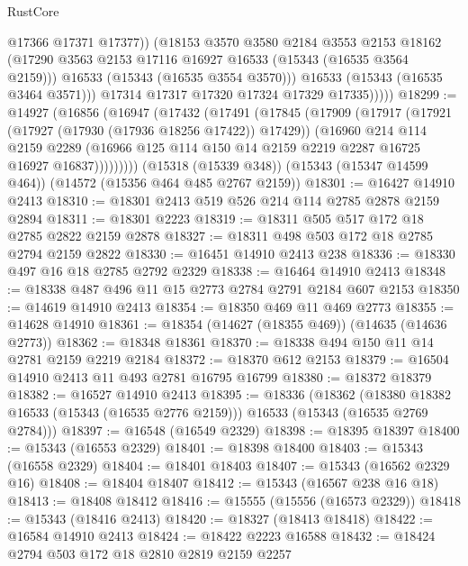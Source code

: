 \begin{lexlean}{RustCore}
\begin{coremodule}
                    @17366
                    @17371
                    @17377))
                (@18153
                  @3570
                  @3580
                  @2184
                  @3553
                  @2153
                  @18162
                  (@17290 @3563 @2153 @17116 @16927 @16533 (@15343 (@16535 @3564 @2159)))
                  @16533
                  (@15343 (@16535 @3554 @3570)))
                @16533
                (@15343 (@16535 @3464 @3571)))
              @17314
              @17317
              @17320
              @17324
              @17329
              @17335)))))
@18299 := @14927
    (@16856
      (@16947
        (@17432
          (@17491
            (@17845
              (@17909
                (@17917
                  (@17921 (@17927 (@17930 (@17936 @18256 @17422)) @17429))
                  (@16960
                    @214
                    @114
                    @2159
                    @2289
                    (@16966 @125 @114 @150 @14 @2159 @2219 @2287 @16725 @16927 @16837)))))))))
    (@15318 (@15339 @348))
    (@15343 (@15347 @14599 @464))
    (@14572 (@15356 @464 @485 @2767 @2159))
@18301 := @16427 @14910 @2413
@18310 := @18301 @2413 @519 @526 @214 @114 @2785 @2878 @2159 @2894
@18311 := @18301 @2223
@18319 := @18311 @505 @517 @172 @18 @2785 @2822 @2159 @2878
@18327 := @18311 @498 @503 @172 @18 @2785 @2794 @2159 @2822
@18330 := @16451 @14910 @2413 @238
@18336 := @18330 @497 @16 @18 @2785 @2792 @2329
@18338 := @16464 @14910 @2413
@18348 := @18338 @487 @496 @11 @15 @2773 @2784 @2791 @2184 @607 @2153
@18350 := @14619 @14910 @2413
@18354 := @18350 @469 @11 @469 @2773
@18355 := @14628 @14910
@18361 := @18354 (@14627 (@18355 @469)) (@14635 (@14636 @2773))
@18362 := @18348 @18361
@18370 := @18338 @494 @150 @11 @14 @2781 @2159 @2219 @2184
@18372 := @18370 @612 @2153
@18379 := @16504 @14910 @2413 @11 @493 @2781 @16795 @16799
@18380 := @18372 @18379
@18382 := @16527 @14910 @2413
@18395 := @18336
    (@18362
      (@18380 @18382 @16533 (@15343 (@16535 @2776 @2159)))
      @16533
      (@15343 (@16535 @2769 @2784)))
@18397 := @16548 (@16549 @2329)
@18398 := @18395 @18397
@18400 := @15343 (@16553 @2329)
@18401 := @18398 @18400
@18403 := @15343 (@16558 @2329)
@18404 := @18401 @18403
@18407 := @15343 (@16562 @2329 @16)
@18408 := @18404 @18407
@18412 := @15343 (@16567 @238 @16 @18)
@18413 := @18408 @18412
@18416 := @15555 (@15556 (@16573 @2329))
@18418 := @15343 (@18416 @2413)
@18420 := @18327 (@18413 @18418)
@18422 := @16584 @14910 @2413
@18424 := @18422 @2223 @16588
@18432 := @18424 @2794 @503 @172 @18 @2810 @2819 @2159 @2257

\end{coremodule}
\end{lexlean}
